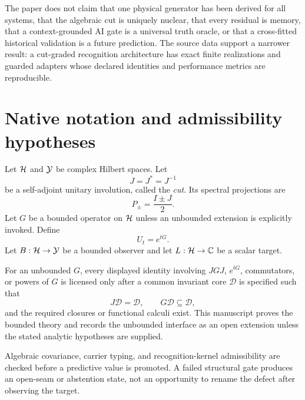 The paper does not claim that one physical generator has been derived for all systems, that the algebraic cut is uniquely nuclear, that every residual is memory, that a context-grounded AI gate is a universal truth oracle, or that a cross-fitted historical validation is a future prediction. The source data support a narrower result: a cut-graded recognition architecture has exact finite realizations and guarded adapters whose declared identities and performance metrics are reproducible.

\section{Native notation and admissibility hypotheses}

Let $\mathcal H$ and $\mathcal Y$ be complex Hilbert spaces. Let
\[
 J=J^*=J^{-1}
\]
be a self-adjoint unitary involution, called the \emph{cut}. Its spectral projections are
\[
 P_\pm=\frac{I\pm J}{2}.
\]
Let $G$ be a bounded operator on $\mathcal H$ unless an unbounded extension is explicitly invoked. Define
\[
 U_t=e^{tG}.
\]
Let $B:\mathcal H\to\mathcal Y$ be a bounded observer and let $L:\mathcal H\to\mathbb C$ be a scalar target.

For an unbounded $G$, every displayed identity involving $JGJ$, $e^{tG}$, commutators, or powers of $G$ is licensed only after a common invariant core $\mathcal D$ is specified such that
\[
 J\mathcal D=\mathcal D,
 \qquad
 G\mathcal D\subseteq\mathcal D,
\]
and the required closures or functional calculi exist. This manuscript proves the bounded theory and records the unbounded interface as an open extension unless the stated analytic hypotheses are supplied.

\begin{principle}
Algebraic covariance, carrier typing, and recognition-kernel admissibility are checked before a predictive value is promoted. A failed structural gate produces an open-seam or abstention state, not an opportunity to rename the defect after observing the target.
\end{principle}
